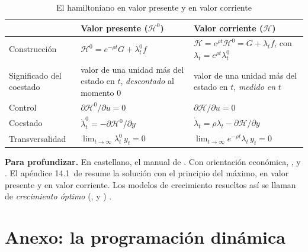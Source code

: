 \documentclass[11pt]{article}
\begin{document}
\begin{table}[H]
\centering
\caption{El hamiltoniano en valor presente y en valor corriente}\label{tab:hamiltonianos}
\small
\begin{tabular}{>{\raggedright\arraybackslash}m{2.4cm}>{\raggedright\arraybackslash}m{6cm}>{\raggedright\arraybackslash}m{6cm}}
\toprule
\rowcolor{tceeazulpalido} & \textbf{Valor presente ($\mathcal{H}^0$)} & \textbf{Valor corriente ($\mathcal{H}$)}\\
\midrule
Construcción & $\mathcal{H}^0=e^{-\rho t}G+\lambda^0_t f$ & $\mathcal{H}=e^{\rho t}\mathcal{H}^0=G+\lambda_t f$, con $\lambda_t=e^{\rho t}\lambda^0_t$\\
\addlinespace[0.3em]
Significado del coestado & valor de una unidad más del estado en $t$, \emph{descontado} al momento 0 & valor de una unidad más del estado en $t$, \emph{medido en} $t$\\
\addlinespace[0.3em]
Control & $\partial\mathcal{H}^0/\partial u=0$ & $\partial\mathcal{H}/\partial u=0$\\
\addlinespace[0.3em]
Coestado & $\dot\lambda^0_t=-\partial\mathcal{H}^0/\partial y$ & $\dot\lambda_t=\rho\lambda_t-\partial\mathcal{H}/\partial y$\\
\addlinespace[0.3em]
Transversalidad & $\lim_{t\to\infty}\lambda^0_t\,y_t=0$ & $\lim_{t\to\infty}e^{-\rho t}\lambda_t\,y_t=0$\\
\bottomrule
\end{tabular}
\end{table}

\begin{anotaciones}
\textbf{Para profundizar.} En castellano, el manual de \textcite{Cerda2001Optimizacion}. Con orientación económica, \textcite{Acemoglu2009}, \textcite{Heijdra2009Foundations} y \textcite{ObstfeldRogoff1996Foundations}. El apéndice 14.1~de \textcite{PermanEtAl2011Natural} resume la solución con el principio del máximo, en valor presente y en valor corriente. Los modelos de crecimiento resueltos así se llaman de \emph{crecimiento óptimo} (,  y ) .
\end{anotaciones}

\section{Anexo: la programación dinámica}\label{anexo:bellman}
\end{document}
